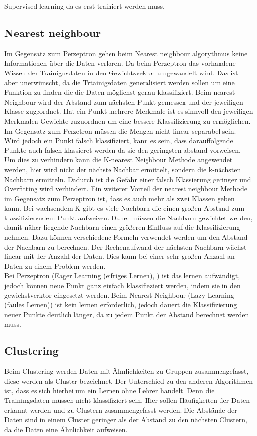 Supervised learning da es erst trainiert werden muss.

\subsection{Nearest neighbour}

Im Gegensatz zum Perzeptron gehen beim Nearest neighbour algorythmus keine Informationen über die Daten verloren. Da beim Perzeptron das vorhandene Wissen der Trainignsdaten in den Gewichtsvektor umgewandelt wird. Das ist aber unerwünscht, da die Trtainigsdaten generalisiert werden sollen um eine Funktion zu finden die die Daten möglichst genau klassifiziert. Beim nearest Neighbour wird der Abstand zum nächsten Punkt gemessen und der jeweiligen Klasse zugeordnet. Hat ein Punkt mehrere Merkmale ist es sinnvoll den jeweiligen Merkmalen Gewichte zuzuordnen um eine bessere Klassifizierung zu ermöglichen. Im Gegensatz zum Perzetron müssen die Mengen nicht linear separabel sein. Wird jedoch ein Punkt falsch klassifiziert, kann es sein, dass darauffolgende Punkte auch falsch klassieret werden da sie den geringsten abstand vorweisen. Um dies zu verhindern kann die K-nearest Neighbour Methode angewendet werden, hier wird nicht der nächste Nachbar ermittelt, sondern die k-nächsten Nachbarn ermitteln. Dadurch ist die Gefahr einer falsch Klassierung geringer und Overfitting wird verhindert. Ein weiterer Vorteil der nearest neighbour Methode im Gegensatz zum Perzeptron ist, dass es auch mehr als zwei Klassen geben kann. Bei wachsendem K gibt es viele Nachbarn die einen großen Abstand zum klassifizierendem Punkt aufweisen. Daher müssen die Nachbarn gewichtet werden, damit näher liegende Nachbarn einen größeren Einfluss auf die Klassifizierung nehmen. Dazu können verschiedene Formeln verwendet werden um den Abstand der Nachbarn zu berechnen. Der Rechenaufwand der nächsten Nachbarn wächst linear mit der Anzahl der Daten. Dies kann bei einer sehr großen Anzahl an Daten zu einem Problem werden.
\\
Bei Perzeptron (Eager Learning (eifriges Lernen), ) ist das lernen aufwändigt, jedoch können neue Punkt ganz einfach klassifieziert werden, indem sie in den gewichstverktor eingesetzt werden. Beim Nearest Neighbour (Lazy Learning (faules Lernen)) ist kein lernen erforderlich, jedoch dauert die Klassifizierung neuer Punkte deutlich länger, da zu jedem Punkt der Abstand berechnet werden muss.


\subsection{Clustering}
Beim Clustering werden Daten mit Ähnlichkeiten zu Gruppen zusammengefasst, diese werden als Cluster bezeichnet. Der Unterschied zu den anderen Algorithmen ist, dass es sich hierbei um ein Lernen ohne Lehrer handelt. Denn die Trainingsdaten müssen nicht klassifiziert sein. Hier sollen Häufigkeiten der Daten erkannt werden und zu Clustern zusammengefasst werden. Die Abstände der Daten sind in einem Cluster geringer als der Abstand zu den nächsten Clustern, da die Daten eine Ähnlichkeit aufweisen.

